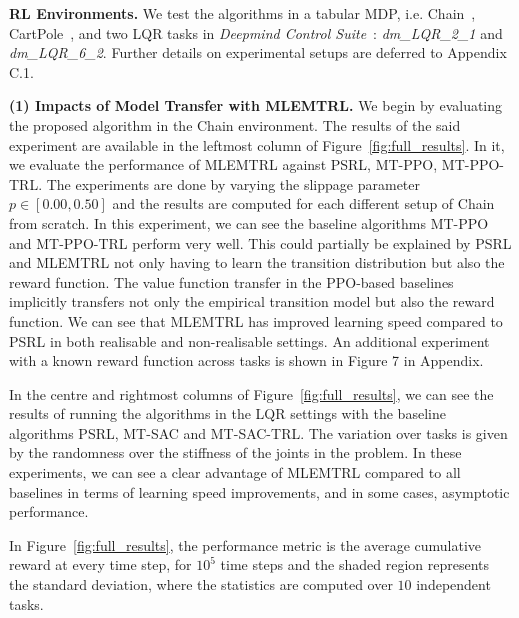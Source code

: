 \noindent\textbf{RL Environments.} We test the algorithms in a tabular MDP, i.e. Chain~\citep{dearden1998bayesian}, CartPole~\citep{barto1983neuronlike}, and two LQR tasks in \emph{Deepmind Control Suite}~\citep{tassa2018deepmind}: \emph{dm\_LQR\_2\_1} and \emph{dm\_LQR\_6\_2}. %
Further details on experimental setups are deferred to Appendix C.1.


\noindent\textbf{(1) Impacts of Model Transfer with MLEMTRL.}\label{sec:impacts} We begin by evaluating the proposed algorithm in the Chain environment. The results of the said experiment are available in the leftmost column of Figure~\ref{fig:full_results}. In it, we evaluate the performance of MLEMTRL against PSRL, MT-PPO, MT-PPO-TRL. The experiments are done by varying the slippage parameter $p \in [0.00, 0.50]$ and the results are computed for each different setup of Chain from scratch. In this experiment, we can see the baseline algorithms MT-PPO and MT-PPO-TRL perform very well. This could partially be explained by PSRL and MLEMTRL not only having to learn the transition distribution but also the reward function. The value function transfer in the PPO-based baselines implicitly transfers not only the empirical transition model but also the reward function. We can see that MLEMTRL has improved learning speed compared to PSRL in both realisable and non-realisable settings. 
An additional experiment with a known reward function across tasks is shown in %
Figure 7 in Appendix.

In the centre and rightmost columns of Figure~\ref{fig:full_results}, we can see the results of running the algorithms in the LQR settings with the baseline algorithms PSRL, MT-SAC and MT-SAC-TRL. The variation over tasks is given by the randomness over the stiffness of the joints in the problem. In these experiments, we can see a clear advantage of MLEMTRL compared to all baselines in terms of learning speed improvements, and in some cases, asymptotic performance.

In Figure~\ref{fig:full_results}, the performance metric is the average cumulative reward at every time step, for $10^5$ time steps and the shaded region represents the standard deviation, where the statistics are computed over $10$ independent tasks. %

